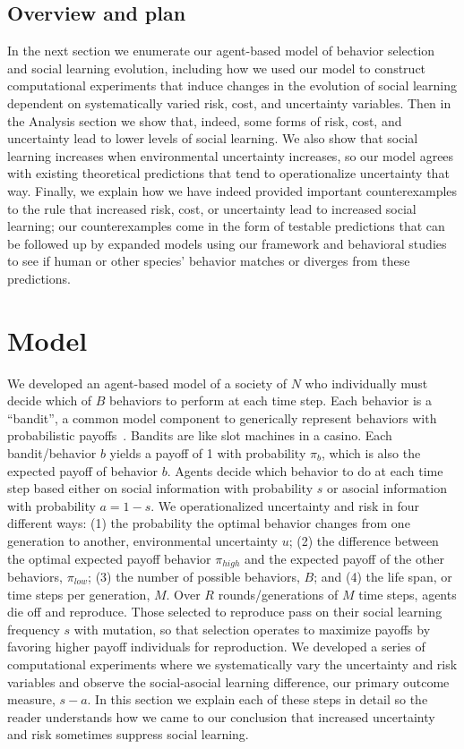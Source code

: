 \documentclass[10pt,letterpaper]{article}
\begin{document}
\subsection{Overview and plan}

In the next section we enumerate our agent-based model of behavior selection and
social learning evolution, including how we used our model to construct
computational experiments that induce changes in the evolution of social learning 
dependent on systematically varied risk, cost, and uncertainty variables.
Then in the Analysis section we show that, indeed, some forms of risk, cost, 
and uncertainty lead to lower levels of social learning. We also show that 
social learning increases when environmental uncertainty increases, so our model
agrees with existing theoretical predictions that tend to operationalize 
uncertainty that way. Finally, we explain how we have indeed provided important 
counterexamples to the rule that increased risk, cost, or uncertainty lead to
increased social learning; our counterexamples come in the form of testable
predictions that can be followed up by expanded models using our framework and
behavioral studies to see if human or other species' behavior matches or diverges
from these predictions.


\section{Model}

We developed an agent-based model of a society of $N$ who individually must decide
which of $B$ behaviors to perform at each time step. Each behavior is a ``bandit'',
a common model component to generically represent behaviors with probabilistic
payoffs~\cite{Rendell2010}. Bandits are like slot machines in a casino. Each
bandit/behavior $b$ yields a payoff of 1 with probability $\pi_b$, 
which is also the expected payoff of behavior $b$. Agents decide which behavior
to do at each time step based either on social information with probability $s$
or asocial information with probability $a = 1 - s$. We operationalized uncertainty
and risk in four different ways: (1) the probability the optimal behavior changes
from one generation to another, environmental uncertainty $u$; (2) the difference
between the optimal expected payoff behavior $\pi_{high}$ and the expected payoff
of the other behaviors, $\pi_{low}$; (3) the number of possible behaviors, $B$;
and (4) the life span, or time steps per generation, $M$. Over $R$
rounds/generations of $M$ time steps, agents die off and reproduce.
Those selected to reproduce pass on their social learning frequency $s$ with
mutation, so that selection operates to maximize payoffs by favoring higher payoff
individuals for reproduction. We developed a series of computational experiments
where we systematically vary the uncertainty and risk variables and observe the
social-asocial learning difference, our primary outcome measure, $s - a$. In this
section we explain each of these steps in detail so the reader understands how we
came to our conclusion that increased uncertainty and risk sometimes suppress social
learning.
\end{document}
